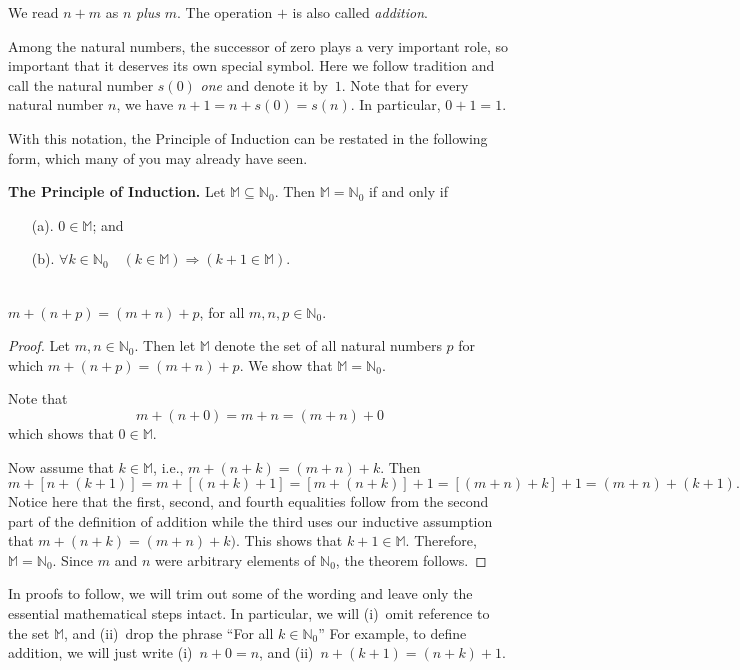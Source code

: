 We read $n+m$ as $n$ \textit{plus} $m$.  The operation $+$
is also called \textit{addition}.  

Among the natural numbers, the successor of zero plays a very
important role, so important that it deserves its own special
symbol.  Here we follow tradition and call the natural number
$s(0)$ \textit{one} and denote it by~$1$.
Note that for every natural number
$n$, we have $n+1=n+s(0)=s(n)$.  In particular, $0+1=1$.

With this notation, the Principle of Induction can be 
restated in the following form, which many of you may already have seen.

\medskip
\noindent
\textbf{The Principle of Induction.}\quad
Let $\mathbb{M}\subseteq \mathbb{N}_0$.  
Then $\mathbb{M} =\mathbb{N}_0$ if and only if
\begin{enumerate}
\item[(a).] $0\in \mathbb{M}$; and 
\item[(b).] $\forall k\in \mathbb{N}_0\quad(k\in \mathbb{M}) 
  \Longrightarrow(k+1\in \mathbb{M})$. 
\end{enumerate}

\begin{theorem}{}\\
$m+(n+p) = (m+n)+p$, for all $m,n,p\in \mathbb{N}_0$.
\end{theorem}

\begin{proof}
Let $m,n\in \mathbb{N}_0$. Then let 
$\mathbb{M}$ denote the set of all natural numbers $p$ for
which $m+(n+p)=(m+n)+p$.  We show that $\mathbb{M}=\mathbb{N}_0$.

Note that 
\[
m+(n+0) = m+n = (m+n)+0 
\]
which shows that $0\in \mathbb{M}$.

Now assume that $k\in \mathbb{M}$, i.e., $m+(n+k) = (m+n)+k$.
Then
\[
m+[n+(k+1)]=m+[(n+k)+1]=[m+(n+k)]+1= [(m+n)+k]+1=(m+n)+(k+1). 
\]
Notice here that the first, second, and fourth equalities follow from
the second part of the definition of addition while the third uses our
inductive assumption that $m+(n+k)=(m+n)+k)$. This shows that $k+1\in
\mathbb{M}$.  Therefore, $\mathbb{M}= \mathbb{N}_0$.  Since $m$ and
$n$ were arbitrary elements of $\mathbb{N}_0$, the theorem follows.
\end{proof}

In proofs to follow, we will trim out some of the wording
and leave only the essential mathematical steps intact.
In particular, we will (i)~omit reference to the set $\mathbb{M}$,
and (ii)~drop the phrase ``For all $k\in\mathbb{N}_0$'' 
For example, to define addition, we will just
write (i)~$n+0=n$, and (ii)~$n+(k+1) = (n+k)+1$.

